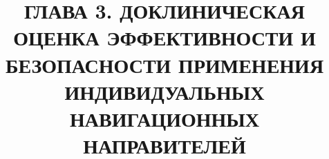 
\title{
ГЛАВА 3. ДОКЛИНИЧЕСКАЯ ОЦЕНКА ЭФФЕКТИВНОСТИ И
БЕЗОПАСНОСТИ ПРИМЕНЕНИЯ ИНДИВИДУАЛЬНЫХ
НАВИГАЦИОННЫХ НАПРАВИТЕЛЕЙ
}
